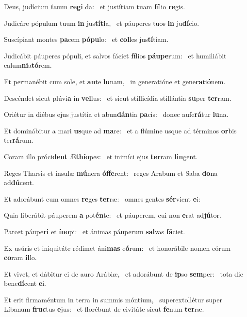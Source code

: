 \item Deus, judícium \textbf{tu}um \textbf{re}\textbf{gi} da:~\psstar{} et justítiam tuam \textbf{fí}lio \textbf{re}gis.
\item Judicáre pópulum tuum \textbf{in} jus\textbf{tí}\textbf{ti}a,~\psstar{} et páuperes tuos \textbf{in} ju\textbf{dí}cio.
\item Suscípiant montes \textbf{pa}cem \textbf{pó}\textbf{pu}lo:~\psstar{} et \textbf{col}les jus\textbf{tí}tiam.
\item Judicábit páuperes pópuli, et salvos fáciet \textbf{fí}lios \textbf{páu}\textbf{pe}rum:~\psstar{} et humiliábit calum\textbf{ni}a\textbf{tó}rem.
\item Et permanébit cum sole, et \textbf{an}te \textbf{lu}nam,~\psstar{} in generatióne et gene\textbf{ra}ti\textbf{ó}nem.
\item Descéndet sicut plúvi\textbf{a} in \textbf{vel}lus:~\psstar{} et sicut stillicídia stillántia \textbf{su}per \textbf{ter}ram.
\item Oriétur in diébus ejus justítia et abun\textbf{dán}tia \textbf{pa}cis:~\psstar{} donec aufe\textbf{rá}tur \textbf{lu}na.
\item Et dominábitur a mari \textbf{us}que ad \textbf{ma}re:~\psstar{} et a flúmine usque ad términos \textbf{or}bis ter\textbf{rá}rum.
\item Coram illo próci\textbf{dent} Æ\textbf{thí}\textbf{o}pes:~\psstar{} et inimíci ejus \textbf{ter}ram \textbf{lin}gent.
\item Reges Tharsis et ínsulæ \textbf{mú}nera \textbf{óf}\textbf{fe}rent:~\psstar{} reges Arabum et Saba \textbf{do}na ad\textbf{dú}cent.
\item Et adorábunt eum omnes \textbf{re}ges \textbf{ter}ræ:~\psstar{} omnes gentes \textbf{sér}vient \textbf{e}i:
\item Quia liberábit páuperem \textbf{a} pot\textbf{én}te:~\psstar{} et páuperem, cui non \textbf{e}rat ad\textbf{jú}tor.
\item Parcet páupe\textbf{ri} et \textbf{ín}\textbf{o}pi:~\psstar{} et ánimas páuperum \textbf{sal}vas \textbf{fá}ciet.
\item Ex usúris et iniquitáte rédimet áni\textbf{mas} e\textbf{ó}rum:~\psstar{} et honorábile nomen eórum \textbf{co}ram \textbf{il}lo.
\item Et vivet, et dábitur ei de auro Arábiæ,~\pscross{} et adorábunt de \textbf{ip}so \textbf{sem}per:~\psstar{} tota die bene\textbf{dí}cent \textbf{e}i.
\item Et erit firmaméntum in terra in summis móntium,~\pscross{} superextollétur super Líbanum \textbf{fruc}tus \textbf{e}jus:~\psstar{} et florébunt de civitáte sicut \textbf{fe}num \textbf{ter}ræ.
